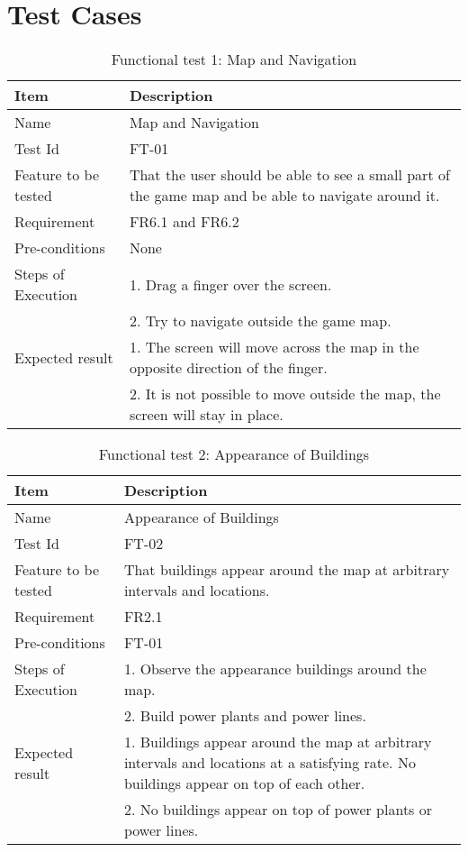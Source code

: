 \chapter{Test Cases}
\label{chap:appTestcases}

\clearpage


\begin{table}[H]
\centering
	\begin{tabular}{ l | p{8cm} }
		\hline
		\rowcolor{lightgray}
		{\bf Item} & {\bf Description} \\ \hline
		Name & Map and Navigation \\ 
		Test Id & FT-01 \\ 
		Feature to be tested & That the user should be able to see a small part of the game map and be able to navigate around it.\\ 
		Requirement & FR6.1 and FR6.2 \\ 
		Pre-conditions & None \\ 
		Steps of Execution & 1. Drag a finger over the screen. \\
		& 2. Try to navigate outside the game map. \\
		Expected result & 1. The screen will move across the map in the opposite direction of the finger.\\ 
		& 2. It is not possible to move outside the map, the screen will stay in place. \\
		\hline
	\end{tabular}
	\caption{Functional test 1: Map and Navigation}
\end{table}

\begin{table}[H]
\centering
	\begin{tabular}{ l | p{8cm} }
		\hline
		\rowcolor{lightgray}
		{\bf Item} & {\bf Description} \\ \hline
		Name & Appearance of Buildings \\ 
		Test Id & FT-02 \\ 
		Feature to be tested & That buildings appear around the map at arbitrary intervals and locations. \\ 
		Requirement & FR2.1 \\ 
		Pre-conditions & FT-01 \\ 
		Steps of Execution & 1. Observe the appearance buildings around the map.\\
		& 2. Build power plants and power lines. \\ 
		Expected result & 1. Buildings appear around the map at arbitrary intervals and locations at a satisfying rate. No buildings appear on top of each other. \\
		& 2. No buildings appear on top of power plants or power lines. \\
		\hline
	\end{tabular}
	\caption{Functional test 2: Appearance of Buildings}
\end{table}

